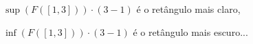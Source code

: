 \documentclass[oneside,12pt]{article}
\begin{document}
\msk

$\sup(F([1,3]))·(3-1) $ é o retângulo mais claro, 

$\inf(F([1,3]))·(3-1) $ é o retângulo mais escuro... 



\newpage


% 
% 
% 
% 
% 
% 
% 
% 
% 
% 
% 


% 
% 
% 
% 

\def\Intover #1#2{\overline {∫}_{#1}#2\,dx}
\def\Intunder#1#2{\underline{∫}_{#1}#2\,dx}
\def\Intoverunder#1#2{\Intover{#1}{#2} - \Intunder{#1}{#2}}
%
\def\Intxover #1#2#3{\overline {∫}_{x=#1}^{x=#2}#3\,dx}
\def\Intxunder#1#2#3{\underline{∫}_{x=#1}^{x=#2}#3\,dx}

\end{document}
